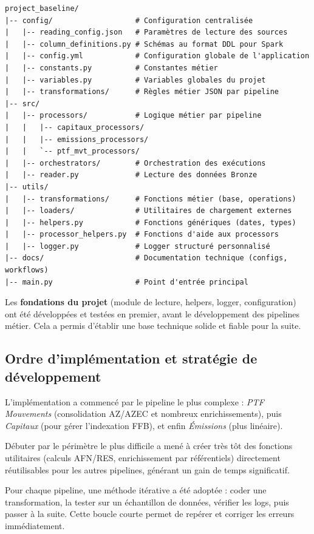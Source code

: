 \begin{verbatim}
project_baseline/
|-- config/                   # Configuration centralisée
|   |-- reading_config.json   # Paramètres de lecture des sources
|   |-- column_definitions.py # Schémas au format DDL pour Spark
|   |-- config.yml            # Configuration globale de l'application
|   |-- constants.py          # Constantes métier
|   |-- variables.py          # Variables globales du projet
|   |-- transformations/      # Règles métier JSON par pipeline
|-- src/
|   |-- processors/           # Logique métier par pipeline
|   |   |-- capitaux_processors/
|   |   |-- emissions_processors/
|   |   `-- ptf_mvt_processors/
|   |-- orchestrators/        # Orchestration des exécutions
|   |-- reader.py             # Lecture des données Bronze
|-- utils/
|   |-- transformations/      # Fonctions métier (base, operations)
|   |-- loaders/              # Utilitaires de chargement externes
|   |-- helpers.py            # Fonctions génériques (dates, types)
|   |-- processor_helpers.py  # Fonctions d'aide aux processors
|   |-- logger.py             # Logger structuré personnalisé
|-- docs/                     # Documentation technique (configs, workflows)
|-- main.py                   # Point d'entrée principal
\end{verbatim}

Les \textbf{fondations du projet} (module de lecture, helpers, logger, configuration) ont été développées et testées en premier, avant le développement des pipelines métier. Cela a permis d'établir une base technique solide et fiable pour la suite.

\subsection{Ordre d'implémentation et stratégie de développement}

L'implémentation a commencé par le pipeline le plus complexe : \textit{PTF Mouvements} (consolidation AZ/AZEC et nombreux enrichissements), puis \textit{Capitaux} (pour gérer l'indexation FFB), et enfin \textit{Émissions} (plus linéaire).

Débuter par le périmètre le plus difficile a mené à créer très tôt des fonctions utilitaires (calculs AFN/RES, enrichissement par référentiels) directement réutilisables pour les autres pipelines, générant un gain de temps significatif.

Pour chaque pipeline, une méthode itérative a été adoptée : coder une transformation, la tester sur un échantillon de données, vérifier les logs, puis passer à la suite. Cette boucle courte permet de repérer et corriger les erreurs immédiatement.

